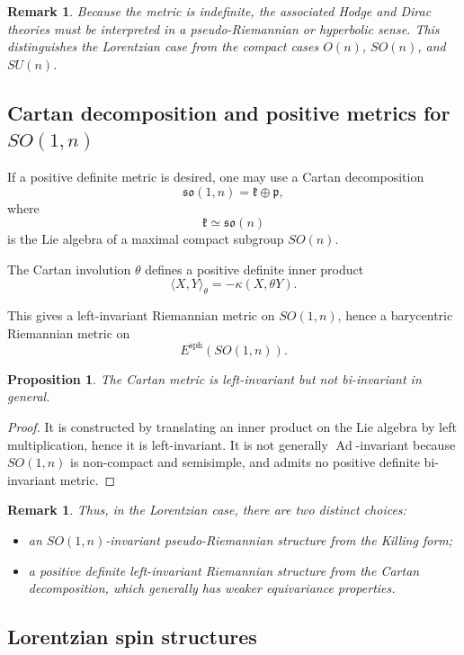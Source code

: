 \documentclass[11pt]{amsart}
\newtheorem{proposition}[theorem]{Proposition}
\newtheorem{remark}[theorem]{Remark}
\begin{document}
\begin{remark}
Because the metric is indefinite, the associated Hodge and Dirac theories must be interpreted in a pseudo-Riemannian or hyperbolic sense. This distinguishes the Lorentzian case from the compact cases \(O(n)\), \(SO(n)\), and \(SU(n)\).
\end{remark}

\subsection{Cartan decomposition and positive metrics for \(SO(1,n)\)}

If a positive definite metric is desired, one may use a Cartan decomposition
\[
\mathfrak{so}(1,n)=\mathfrak k\oplus\mathfrak p,
\]
where
\[
\mathfrak k\simeq \mathfrak{so}(n)
\]
is the Lie algebra of a maximal compact subgroup \(SO(n)\).

The Cartan involution \(\theta\) defines a positive definite inner product
\[
\langle X,Y\rangle_\theta
=
-\kappa(X,\theta Y).
\]

This gives a left-invariant Riemannian metric on \(SO(1,n)\), hence a barycentric Riemannian metric on
\[
E^{\mathrm{sph}}(SO(1,n)).
\]

\begin{proposition}
The Cartan metric is left-invariant but not bi-invariant in general.
\end{proposition}

\begin{proof}
It is constructed by translating an inner product on the Lie algebra by left multiplication, hence it is left-invariant. It is not generally \(\operatorname{Ad}\)-invariant because \(SO(1,n)\) is non-compact and semisimple, and admits no positive definite bi-invariant metric.
\end{proof}

\begin{remark}
Thus, in the Lorentzian case, there are two distinct choices:
\begin{itemize}
\item an \(SO(1,n)\)-invariant pseudo-Riemannian structure from the Killing form;
\item a positive definite left-invariant Riemannian structure from the Cartan decomposition, which generally has weaker equivariance properties.
\end{itemize}
\end{remark}

\subsection{Lorentzian spin structures}
\end{document}
